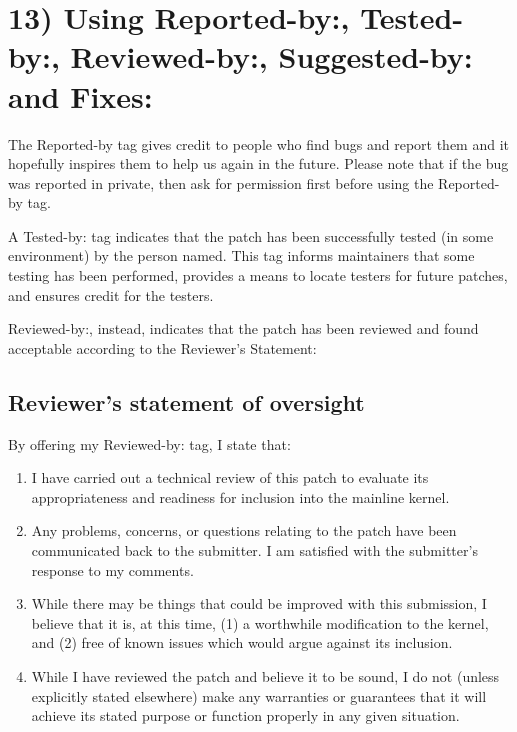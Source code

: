 \documentclass[a4paper,8pt,english]{sphinxmanual}
\begin{document}
\section{13) Using Reported-by:, Tested-by:, Reviewed-by:, Suggested-by: and Fixes:}
\label{process/submitting-patches:using-reported-by-tested-by-reviewed-by-suggested-by-and-fixes}
The Reported-by tag gives credit to people who find bugs and report them and it
hopefully inspires them to help us again in the future.  Please note that if
the bug was reported in private, then ask for permission first before using the
Reported-by tag.

A Tested-by: tag indicates that the patch has been successfully tested (in
some environment) by the person named.  This tag informs maintainers that
some testing has been performed, provides a means to locate testers for
future patches, and ensures credit for the testers.

Reviewed-by:, instead, indicates that the patch has been reviewed and found
acceptable according to the Reviewer's Statement:


\subsection{Reviewer's statement of oversight}
\label{process/submitting-patches:reviewer-s-statement-of-oversight}
By offering my Reviewed-by: tag, I state that:
\begin{enumerate}
\item {} 
I have carried out a technical review of this patch to
evaluate its appropriateness and readiness for inclusion into
the mainline kernel.

\item {} 
Any problems, concerns, or questions relating to the patch
have been communicated back to the submitter.  I am satisfied
with the submitter's response to my comments.

\item {} 
While there may be things that could be improved with this
submission, I believe that it is, at this time, (1) a
worthwhile modification to the kernel, and (2) free of known
issues which would argue against its inclusion.

\item {} 
While I have reviewed the patch and believe it to be sound, I
do not (unless explicitly stated elsewhere) make any
warranties or guarantees that it will achieve its stated
purpose or function properly in any given situation.

\end{enumerate}
\end{document}

